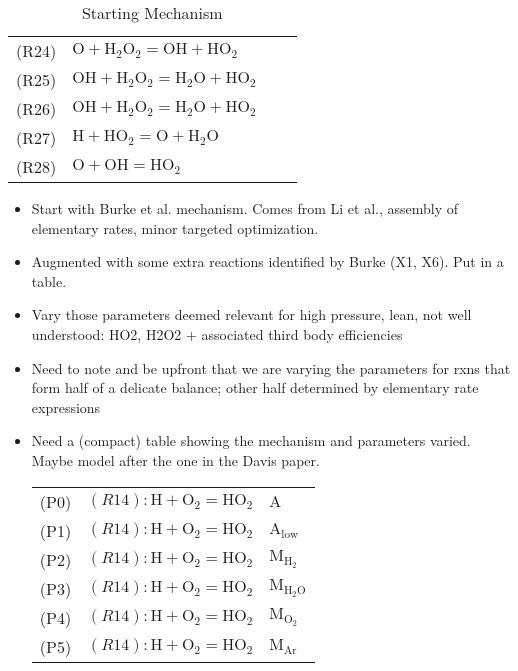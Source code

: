 \documentclass[preprint,3p,times,twocolumn]{elsarticle}
\begin{document}
\begin{table}[htp]
\begin{tabular}{l l l l}
(R24)&$ \mathrm{O} + \mathrm{H}_2\mathrm{O}_2 = \mathrm{OH} + \mathrm{HO}_2$\\
(R25)&$ \mathrm{OH} + \mathrm{H}_2\mathrm{O}_2 = \mathrm{H}_2\mathrm{O} + \mathrm{HO}_2$\\
(R26)&$ \mathrm{OH} + \mathrm{H}_2\mathrm{O}_2 = \mathrm{H}_2\mathrm{O} + \mathrm{HO}_2$\\
(R27)&$ \mathrm{H} + \mathrm{HO}_2 = \mathrm{O} + \mathrm{H}_2\mathrm{O}$\\
(R28)&$ \mathrm{O} + \mathrm{OH} = \mathrm{HO}_2$\\
\hline
  \end{tabular}
  \caption{Starting Mechanism}
  \label{tab:srcmech}
\end{table}
\begin{itemize}
\item Start with Burke et al. mechanism. Comes from Li et al.,
  assembly of elementary rates, minor targeted optimization.
\item Augmented with some extra reactions identified by Burke (X1,
  X6). Put in a table.
\item Vary those parameters deemed relevant for high pressure, lean,
  not well understood: HO2, H2O2 + associated third body efficiencies
\item Need to note and be upfront that we are varying the parameters
  for rxns that form half of a delicate balance; other half determined
  by elementary rate expressions
\item Need a (compact) table showing the mechanism and parameters
  varied. Maybe model after the one in the Davis paper.
  \begin{table}[htp]
    \centering
    \begin{tabular}{l l l}
      \hline
(P0)&$ (R14): \mathrm{H} + \mathrm{O}_2 = \mathrm{HO}_2     $&$ \mathrm{A}$\\
(P1)&$ (R14): \mathrm{H} + \mathrm{O}_2 = \mathrm{HO}_2     $&$ \mathrm{A}_\mathrm{low}$\\
(P2)&$ (R14): \mathrm{H} + \mathrm{O}_2 = \mathrm{HO}_2     $&$ \mathrm{M}_{\mathrm{H}_2}$\\
(P3)&$ (R14): \mathrm{H} + \mathrm{O}_2 = \mathrm{HO}_2     $&$ \mathrm{M}_{\mathrm{H}_2\mathrm{O}}$\\
(P4)&$ (R14): \mathrm{H} + \mathrm{O}_2 = \mathrm{HO}_2     $&$ \mathrm{M}_{\mathrm{O}_2}$\\
(P5)&$ (R14): \mathrm{H} + \mathrm{O}_2 = \mathrm{HO}_2     $&$ \mathrm{M}_{\mathrm{Ar}}$\\

\end{tabular}
\end{table}
\end{itemize}
\end{document}
